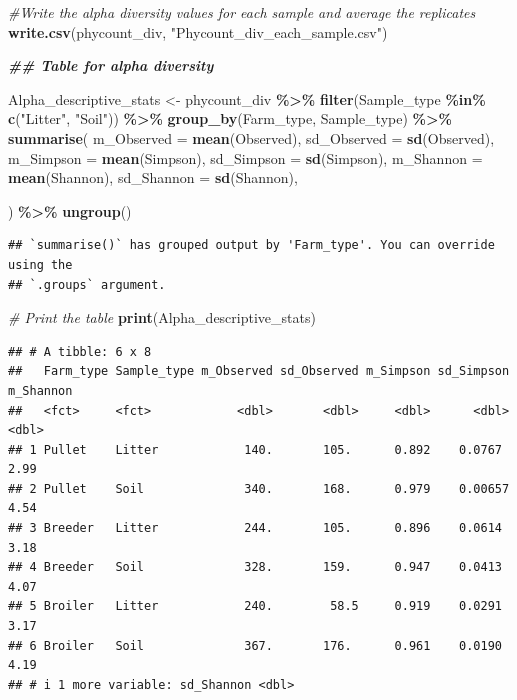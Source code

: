 \documentclass[
]{article}
\newenvironment{Shaded}{\begin{snugshade}}{\end{snugshade}}
\newcommand{\AttributeTok}[1]{\textcolor[rgb]{0.13,0.29,0.53}{#1}}
\newcommand{\CommentTok}[1]{\textcolor[rgb]{0.56,0.35,0.01}{\textit{#1}}}
\newcommand{\DocumentationTok}[1]{\textcolor[rgb]{0.56,0.35,0.01}{\textbf{\textit{#1}}}}
\newcommand{\FunctionTok}[1]{\textcolor[rgb]{0.13,0.29,0.53}{\textbf{#1}}}
\newcommand{\NormalTok}[1]{#1}
\newcommand{\OtherTok}[1]{\textcolor[rgb]{0.56,0.35,0.01}{#1}}
\newcommand{\SpecialCharTok}[1]{\textcolor[rgb]{0.81,0.36,0.00}{\textbf{#1}}}
\newcommand{\StringTok}[1]{\textcolor[rgb]{0.31,0.60,0.02}{#1}}
\begin{document}
\begin{Shaded}
\begin{Highlighting}[]
\CommentTok{\#Write the alpha diversity values for each sample and average the replicates}
\FunctionTok{write.csv}\NormalTok{(phycount\_div, }\StringTok{"Phycount\_div\_each\_sample.csv"}\NormalTok{)}


\DocumentationTok{\#\# Table for alpha diversity}

\NormalTok{Alpha\_descriptive\_stats }\OtherTok{\textless{}{-}}\NormalTok{ phycount\_div }\SpecialCharTok{\%\textgreater{}\%}
  \FunctionTok{filter}\NormalTok{(Sample\_type }\SpecialCharTok{\%in\%} \FunctionTok{c}\NormalTok{(}\StringTok{"Litter"}\NormalTok{, }\StringTok{"Soil"}\NormalTok{)) }\SpecialCharTok{\%\textgreater{}\%}
  \FunctionTok{group\_by}\NormalTok{(Farm\_type, Sample\_type) }\SpecialCharTok{\%\textgreater{}\%}
  \FunctionTok{summarise}\NormalTok{(}
         \AttributeTok{m\_Observed =} \FunctionTok{mean}\NormalTok{(Observed),}
         \AttributeTok{sd\_Observed =} \FunctionTok{sd}\NormalTok{(Observed),}
         \AttributeTok{m\_Simpson =} \FunctionTok{mean}\NormalTok{(Simpson),}
         \AttributeTok{sd\_Simpson =} \FunctionTok{sd}\NormalTok{(Simpson),     }
         \AttributeTok{m\_Shannon =} \FunctionTok{mean}\NormalTok{(Shannon),}
         \AttributeTok{sd\_Shannon =} \FunctionTok{sd}\NormalTok{(Shannon),}

\NormalTok{  ) }\SpecialCharTok{\%\textgreater{}\%}
  \FunctionTok{ungroup}\NormalTok{()}
\end{Highlighting}
\end{Shaded}

\begin{verbatim}
## `summarise()` has grouped output by 'Farm_type'. You can override using the
## `.groups` argument.
\end{verbatim}

\begin{Shaded}
\begin{Highlighting}[]
\CommentTok{\# Print the table}
\FunctionTok{print}\NormalTok{(Alpha\_descriptive\_stats)}
\end{Highlighting}
\end{Shaded}

\begin{verbatim}
## # A tibble: 6 x 8
##   Farm_type Sample_type m_Observed sd_Observed m_Simpson sd_Simpson m_Shannon
##   <fct>     <fct>            <dbl>       <dbl>     <dbl>      <dbl>     <dbl>
## 1 Pullet    Litter            140.       105.      0.892    0.0767       2.99
## 2 Pullet    Soil              340.       168.      0.979    0.00657      4.54
## 3 Breeder   Litter            244.       105.      0.896    0.0614       3.18
## 4 Breeder   Soil              328.       159.      0.947    0.0413       4.07
## 5 Broiler   Litter            240.        58.5     0.919    0.0291       3.17
## 6 Broiler   Soil              367.       176.      0.961    0.0190       4.19
## # i 1 more variable: sd_Shannon <dbl>
\end{verbatim}
\end{document}
